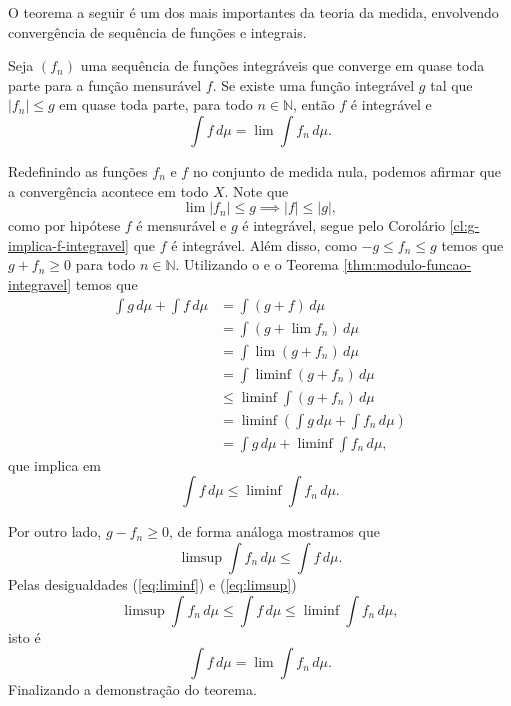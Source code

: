 \documentclass[a4paper, 11pt]{book}
\theoremstyle{definition}
\newcommand{\bN}{\mathbb{N}}
\begin{document}
O teorema a seguir é um dos mais importantes da teoria da medida, envolvendo convergência de sequência de funções e integrais.

\begin{tbox} \label{thm:teorema-da-convergencia-dominada}
    Seja $(f_n)$ uma sequência de funções integráveis que converge em quase toda parte para a função mensurável $f$.
    Se existe uma função integrável $g$ tal que $|f_n| \leqslant g$ em quase toda parte, para todo $n \in \bN$, então $f$ é integrável e
    \[
        \int f \,d\mu = \lim \int f_n \,d\mu.
    \]
\end{tbox}
\begin{prf}
    Redefinindo as funções $f_n$ e $f$ no conjunto de medida nula, podemos afirmar que a convergência acontece em todo $X$. Note que
    \[
        \lim |f_n| \leqslant g \implies |f| \leqslant |g|,
    \]
    como por hipótese $f$ é mensurável e $g$ é integrável, segue pelo Corolário \ref{cl:g-implica-f-integravel} que $f$ é integrável.
    Além disso, como $-g \leqslant f_n \leqslant g$ temos que $g + f_n \geqslant 0$ para todo $n \in \bN$.
    Utilizando o  e o Teorema \ref{thm:modulo-funcao-integravel} temos que
    \[
        \begin{aligned}
            \int g \,d\mu + \int f \, d\mu &= \int (g + f) \,d\mu\\
            &= \int (g + \lim f_n) \,d\mu\\
            &= \int \lim (g + f_n) \,d\mu\\
            &= \int \liminf (g + f_n) \,d\mu\\
            &\leqslant \liminf \int (g + f_n) \,d\mu\\
            &= \liminf \left( \int g \, d\mu + \int f_n \,d\mu \right)\\
            &= \int g \,d\mu + \liminf \int f_n \,d\mu,
        \end{aligned}
    \]
    que implica em
    \begin{equation} \label{eq:liminf}
        \int f \,d\mu \leqslant \liminf \int f_n \,d\mu.
    \end{equation}

    Por outro lado, $g - f_n \geqslant 0$, de forma análoga mostramos que
    \begin{equation} \label{eq:limsup}
        \limsup \int f_n \,d\mu \leqslant \int f\,d\mu.
    \end{equation}
    Pelas desigualdades (\ref{eq:liminf}) e (\ref{eq:limsup})
    \[
        \limsup \int f_n \,d\mu \leqslant \int f \,d\mu \leqslant \liminf \int f_n \,d\mu,
    \]
    isto é\footnotemark
    \[
        \int f \,d\mu = \lim \int f_n \,d\mu.
    \]
    Finalizando a demonstração do teorema.
\end{prf}
\end{document}
